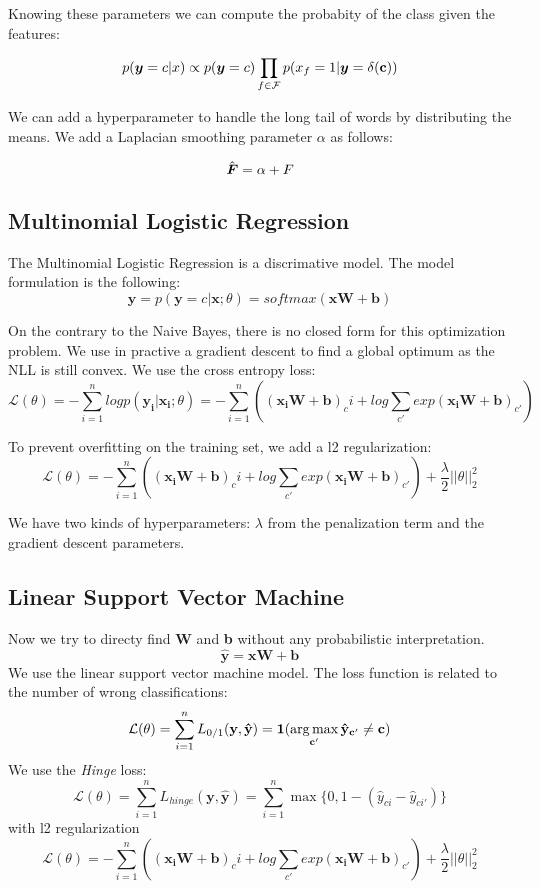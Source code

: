 \documentclass[11pt]{article}
\begin{document}
\noindent Knowing these parameters we can compute the probabity of the class given the features:

\[ p(\boldsymbol{y} = c | x) \propto p(\boldsymbol{y} = c) \prod_{f \in \mathcal{F}} p(x_f = 1 | \boldsymbol{y}=\mathbf{\delta(c)})\]

\noindent We can add a hyperparameter to handle the long tail of words by distributing the means. We add a Laplacian smoothing parameter $\alpha$ as follows:

  \[\hat{\boldsymbol{F}} = \alpha + F\]

\subsection{Multinomial Logistic Regression}

The Multinomial Logistic Regression is a discrimative model. The model formulation is the following:
\[\mathbf{\hat{y}} = p(\mathbf{y} = c | \mathbf{x} ; \theta) = softmax(\mathbf{xW} + \mathbf{b}) \]

\noindent On the contrary to the Naive Bayes, there is no closed form for this optimization problem. We use in practive a gradient descent to find a global optimum as the NLL is still convex. We use the cross entropy loss:
\[ \mathcal{L(\theta)} = - \sum_{i=1}^{n} log p(\mathbf{y_i}| \mathbf{x_i}; \theta) = - \sum_{i=1}^{n} \left( (\mathbf{x_i W} + \mathbf{b})_ci + log \sum_{c'} exp(\mathbf{x_i W} + \mathbf{b})_{c'} \right) \]

\noindent To prevent overfitting on the training set, we add a l2 regularization:
\[ \mathcal{L(\theta)} = - \sum_{i=1}^{n} \left( (\mathbf{x_i W} + \mathbf{b})_ci + log \sum_{c'} exp(\mathbf{x_i W} + \mathbf{b})_{c'} \right) + \frac{\lambda}{2} ||\theta||_2^2\]

\noindent We have two kinds of hyperparameters: $\lambda$ from the penalization term and the gradient descent parameters.

\subsection{Linear Support Vector Machine}

Now we try to directy find \textbf{W} and \textbf{b} without any probabilistic interpretation.
\[\mathbf{\hat{y}} = \mathbf{xW} + \mathbf{b} \]
We use the linear support vector machine model. The loss function is related to the number of wrong classifications:
  \[\mathcal{L}(\theta) = \sum_{i=1}^n L_{0/1}(\mathbf{y}, \mathbf{\hat{y}}) = \mathbf{1(\argmax_{c'} \hat{y}_{c'} \neq c)}\]
  We use the \textit{Hinge} loss:
    \[\mathcal{L}(\theta) = \sum_{i=1}^n L_{hinge}(\mathbf{y},\hat{\mathbf{y}}) =  \sum_{i=1}^n \max\{0, 1 - (\hat{y}_{ci} - \hat{y}_{ci'}) \}  \]
with l2 regularization
\[ \mathcal{L}(\theta) = - \sum_{i=1}^{n} \left( (\mathbf{x_i W} + \mathbf{b})_ci + log \sum_{c'} exp(\mathbf{x_i W} + \mathbf{b})_{c'} \right) + \frac{\lambda}{2} ||\theta||_2^2\]
\end{document}

